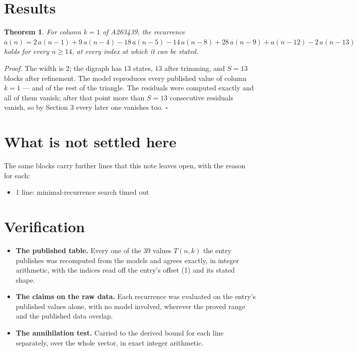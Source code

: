 \documentclass[11pt]{article}
\newtheorem{theorem}{Theorem}
\theoremstyle{definition}
\begin{document}
\section{Results}

\begin{theorem} For column $k = 1$ of A263439, the recurrence $a(n) = 2\,a(n-1) + 9\,a(n-4) - 18\,a(n-5) - 14\,a(n-8) + 28\,a(n-9) + a(n-12) - 2\,a(n-13)$ holds for every $n \ge 14$, at every index at which it can be stated.\end{theorem}

{\itshape Proof.} The width is $2$; the digraph has $13$ states, $13$ after trimming, and $S = 13$ blocks after refinement. The model reproduces every published value of column $k = 1$ --- and of the rest of the triangle. The residuals were computed exactly and all of them vanish; after that point more than $S = 13$ consecutive residuals vanish, so by Section 3 every later one vanishes too. $\square$

\section{What is not settled here}

The same blocks carry further lines that this note leaves open, with the reason for each:

\begin{itemize}

\item 1 line: minimal-recurrence search timed out

\end{itemize}

\section{Verification}

\begin{itemize}

\item {\bfseries The published table.} Every one of the 39 values $T(n,k)$ the entry publishes was recomputed from the models and agrees exactly, in integer arithmetic, with the indices read off the entry's offset (1) and its stated shape.

\item {\bfseries The claims on the raw data.} Each recurrence was evaluated on the entry's published values alone, with no model involved, wherever the proved range and the published data overlap.

\item {\bfseries The annihilation test.} Carried to the derived bound for each line separately, over the whole vector, in exact integer arithmetic.

\end{itemize}
\end{document}
